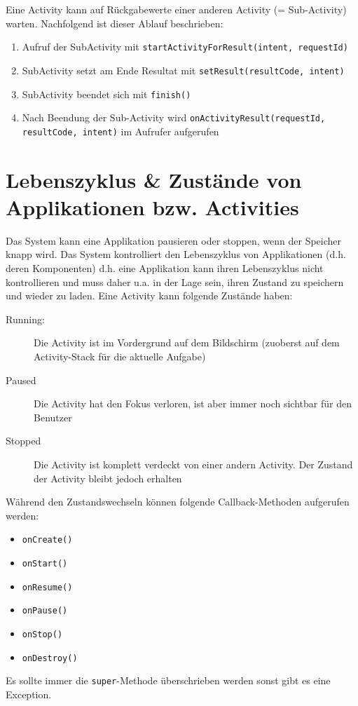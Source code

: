 Eine Activity kann auf Rückgabewerte einer anderen Activity (= Sub-Activity) warten. Nachfolgend ist dieser Ablauf beschrieben:
\begin{enumerate}
	\item Aufruf der SubActivity mit \texttt{startActivityForResult(intent, requestId)}
	\item SubActivity setzt am Ende Resultat mit \texttt{setResult(resultCode, intent)}
	\item SubActivity beendet sich mit \texttt{finish()}
	\item Nach Beendung der Sub-Activity wird \texttt{onActivityResult(requestId, resultCode, intent)} im Aufrufer aufgerufen
\end{enumerate}

\section{Lebenszyklus \& Zustände von Applikationen bzw. Activities}

Das System kann eine Applikation pausieren oder stoppen, wenn der Speicher knapp wird. Das System kontrolliert den Lebenszyklus von Applikationen (d.h. deren Komponenten) d.h. eine Applikation kann ihren Lebenszyklus nicht kontrollieren und muss daher u.a. in der Lage sein, ihren Zustand zu speichern und wieder zu laden. 
Eine Activity kann folgende Zustände haben:
\begin{description}
	\item[Running:]	Die Activity ist im Vordergrund auf dem Bildschirm (zuoberst auf dem Activity-Stack	für die aktuelle Aufgabe)
	\item[Paused] Die Activity hat den Fokus verloren, ist aber	immer noch sichtbar für den Benutzer
	\item[Stopped] Die Activity ist komplett verdeckt von einer	andern Activity. Der Zustand der Activity bleibt jedoch erhalten
\end{description}
Während den Zustandswechseln können folgende Callback-Methoden aufgerufen werden:
\begin{itemize}
	\item \texttt{onCreate()}
	\item \texttt{onStart()}
	\item \texttt{onResume()}	
	\item \texttt{onPause()}	
	\item \texttt{onStop()}	
	\item \texttt{onDestroy()}	
\end{itemize}
Es sollte immer die \texttt{super}-Methode überschrieben werden sonst gibt es eine Exception.


